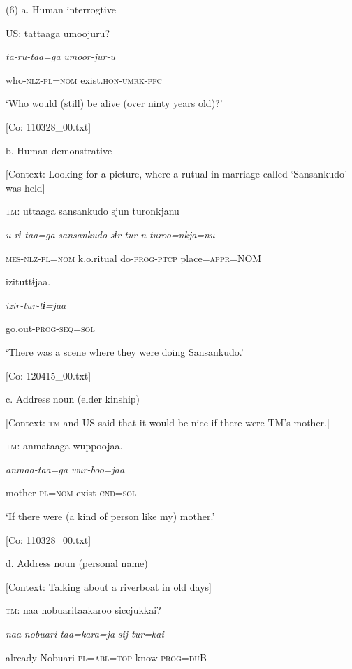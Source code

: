 (6)  a.  Human interrogtive

    US:  tattaaga  umoojuru?

      \textit{ta-ru-taa=ga}  \textit{umoor-jur-u}

      who-\textsc{nlz}-\textsc{pl}=\textsc{nom}  exist.\textsc{hon}-\textsc{umrk}-\textsc{pfc}

      ‘Who would (still) be alive (over ninty years old)?’

      [Co: 110328\_00.txt]

  b.  Human demonstrative

    [Context: Looking for a picture, where a rutual in marriage called ‘Sansankudo’ was held]

    \textsc{tm}:  uttaaga  {\textbar}sansankudo{\textbar}  sjun  turonkjanu

      \textit{u-rɨ-taa=ga}  \textit{sansankudo}  \textit{sɨr-tur-n}  \textit{turoo=nkja=nu}

      \textsc{mes}-\textsc{nlz}-\textsc{pl}=\textsc{nom}  k.o.ritual  do-\textsc{prog}-\textsc{ptcp}  place=\textsc{appr}=NOM

      izituttɨjaa.

      \textit{izir-tur-tɨ=jaa}

      go.out-\textsc{prog}-\textsc{seq}=\textsc{sol}

      ‘There was a scene where they were doing Sansankudo.’

      [Co: 120415\_00.txt]

  c.  Address noun (elder kinship)

    [Context: \textsc{tm} and US said that it would be nice if there were TM’s mother.]

    \textsc{tm}:  anmataaga  wuppoojaa.

      \textit{anmaa-taa=ga}  \textit{wur-boo=jaa}

      mother-\textsc{pl}=\textsc{nom}  exist-\textsc{cnd}=\textsc{sol}

      ‘If there were (a kind of person like my) mother.’

      [Co: 110328\_00.txt]

  d.  Address noun (personal name)

    [Context: Talking about a riverboat in old days]

    \textsc{tm}:  naa  nobuaritaakaroo  siccjukkai?

      \textit{naa}  \textit{nobuari-taa=kara=ja}  \textit{sij-tur=kai}

      already  Nobuari-\textsc{pl}=\textsc{abl}=\textsc{top}  know-\textsc{prog}=\textsc{du}B

